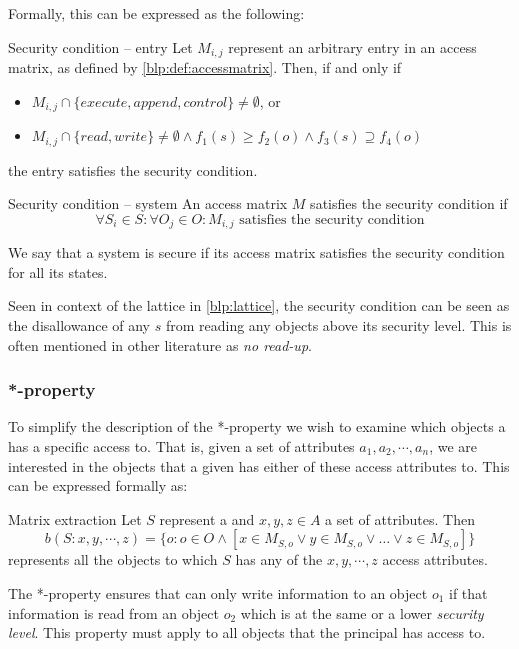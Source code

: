 Formally, this can be expressed as the following:
\begin{definition}{Security condition -- entry}
Let $M_{i,j}$ represent an arbitrary entry in an access matrix, as defined by \cref{blp:def:accessmatrix}.
Then, if and only if
\begin{itemize}
  \item $M_{i,j} \cap \{execute, append, control\} \neq \emptyset$, or
  \item $M_{i,j} \cap \{read, write\} \neq \emptyset \wedge f_1(s) \ge f_2(o) \wedge f_3(s) \supseteq f_4(o)$
\end{itemize}
the entry satisfies the security condition.

\end{definition}
\begin{definition}{Security condition -- system}
An access matrix $M$ satisfies the security condition if
$$\forall S_i \in S: \forall O_j \in O: M_{i,j} \text{ satisfies the security condition}$$

We say that a system is secure if its access matrix satisfies the security condition for all its states.
\end{definition}

Seen in context of the lattice in \cref{blp:lattice}, the security condition can be seen as the disallowance of any \ssubject{} $s$ from reading any objects above its security level.
This is often mentioned in other literature as \emph{no read-up}.

\subsubsection{*-property}
To simplify the description of the *-property we wish to examine which objects a \principal{} has a specific access to.
That is, given a set of attributes $a_1, a_2, \cdots, a_n$, we are interested in the objects that a given \principal{} has either of these access attributes to.
This can be expressed formally as:

\begin{definition}{Matrix extraction}
  Let $S$ represent a \principal{} and $x,y,z \in A$ a set of attributes.
  Then $$b(S:x, y, \cdots, z) = \{o:o\in O \wedge [x \in M_{S,o} \vee y \in M_{S,o} \vee \dots \vee z \in M_{S,o}]\}$$
  represents all the objects to which $S$ has any of the $x, y, \cdots, z$ access attributes.
\end{definition}

The *-property ensures that \principals{} can only write information to an object $o_1$ if that information is read from an object $o_2$ which is at the same or a lower \emph{security level}.
This property must apply to all objects that the principal has access to.


